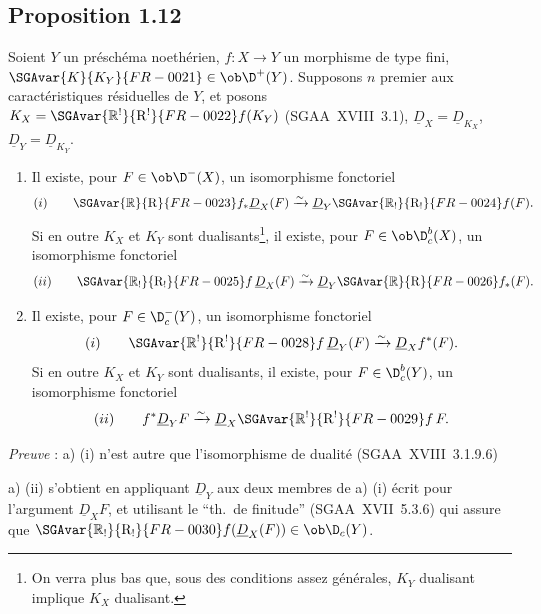 \subsection*{Proposition 1.12}
Soient $Y$ un préschéma noethérien, $f : X \to Y$ un morphisme de type fini, $\SGAvar{K}{K_Y}{FR-0021} \in \ob \D^{+}(Y)$. Supposons $n$ premier aux caractéristiques résiduelles de $Y$, et posons $K_X = \SGAvar{\mathbb{R}^{!}}{\mathrm{R}^{!}}{FR-0022}f(K_Y)$ (SGAA~XVIII~3.1), $\underline{D}_X = \underline{D}_{K_X}$, $\underline{D}_Y = \underline{D}_{K_Y}$.
\begin{enumerate}
\item[a)] Il existe, pour $F \in \ob \D^{-}(X)$, un isomorphisme fonctoriel
\[
(i) \qquad \SGAvar{\mathbb{R}}{\mathrm{R}}{FR-0023} f_{*} \underline{D}_X(F) \xrightarrow{\sim} \underline{D}_Y \SGAvar{\mathbb{R}_{!}}{\mathrm{R}_{!}}{FR-0024}f(F).
\]
Si en
outre $K_X$ et $K_Y$ sont dualisants\footnote{On verra plus bas que, sous des conditions assez générales, $K_Y$ dualisant implique $K_X$ dualisant.}, il existe, pour $F \in \ob \D_c^{b}(X)$, un isomorphisme fonctoriel
\[
(ii) \qquad \SGAvar{\mathbb{R}_{!}}{\mathrm{R}_{!}}{FR-0025}f \, \underline{D}_X(F) \xrightarrow{\sim} \underline{D}_Y \SGAvar{\mathbb{R}}{\mathrm{R}}{FR-0026} f_{*}(F).
\]
\item[b)] Il existe, pour $F \in \D_c^{-}(Y)$, un isomorphisme fonctoriel
\[
(i) \qquad \SGAvar{\mathbb{R}^{!}}{\mathrm{R}^{!}}{FR-0028}f \, \underline{D}_Y(F) \xrightarrow{\sim} \underline{D}_X f^{*}(F).
\]
Si en outre $K_X$ et $K_Y$ sont dualisants\footnotemark[3], il existe, pour $F \in \D_c^{b}(Y)$, un isomorphisme fonctoriel
\[
(ii) \qquad f^{*} \underline{D}_Y F \xrightarrow{\sim} \underline{D}_X \SGAvar{\mathbb{R}^{!}}{\mathrm{R}^{!}}{FR-0029}f \, F.
\]
\end{enumerate}

\emph{Preuve} : a) (i) n'est autre que l'isomorphisme de dualité (SGAA~XVIII~3.1.9.6)

a) (ii) s'obtient en appliquant $\underline{D}_Y$ aux deux membres de a) (i) écrit pour l'argument $\underline{D}_X F$, et utilisant le ``th.~de finitude'' (SGAA~XVII~5.3.6) qui assure que $\SGAvar{\mathbb{R}_{!}}{\mathrm{R}_{!}}{FR-0030}f(\underline{D}_X(F)) \in \ob \D_c(Y)$.

